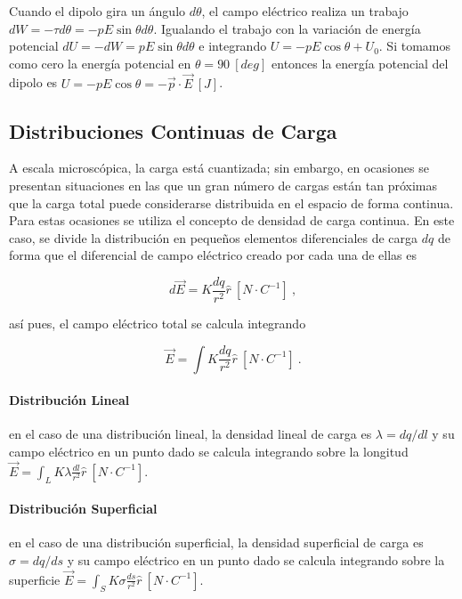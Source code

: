 \documentclass{tufte-handout}
\begin{document}
Cuando el dipolo gira un ángulo $d\theta$, el campo eléctrico realiza un trabajo $dW = -\tau d\theta = -pE\sin{\theta}d\theta$. Igualando el trabajo con la variación de energía potencial $dU = -dW = pE\sin{\theta}d\theta$ e integrando $U = -pE\cos{\theta} + U_0$. Si tomamos como cero la energía potencial en $\theta = 90~[deg]$ entonces la energía potencial del dipolo es $U = -pE\cos{\theta} = -\vec{p}\cdot \vec{E}~[J]$.

\newpage

\subsection{Distribuciones Continuas de Carga}

A escala microscópica, la carga está cuantizada; sin embargo, en ocasiones se presentan situaciones en las que un gran número de cargas están tan próximas que la carga total puede considerarse distribuida en el espacio de forma continua. Para estas ocasiones se utiliza el concepto de densidad de carga continua. En este caso, se divide la distribución en pequeños elementos diferenciales de carga $dq$ de forma que el diferencial de campo eléctrico creado por cada una de ellas es

\begin{equation}
d\vec{E} = K\frac{dq}{r^2}\hat{r}~[N\cdot C^{-1}]~,
\end{equation}

así pues, el campo eléctrico total se calcula integrando

\begin{equation}
\vec{E} = \int K\frac{dq}{r^2}\hat{r}~[N\cdot C^{-1}]~.
\end{equation}

\paragraph{Distribución Lineal} en el caso de una distribución lineal, la densidad lineal de carga es $\lambda = dq / dl$ y su campo eléctrico en un punto dado se calcula integrando sobre la longitud $\vec{E} = \int_L K\lambda\frac{dl}{r^2}\hat{r}~[N\cdot C^{-1}]$.

\paragraph{Distribución Superficial} en el caso de una distribución superficial, la densidad superficial de carga es $\sigma = dq / ds$ y su campo eléctrico en un punto dado se calcula integrando sobre la superficie $\vec{E} = \int_S K\sigma\frac{ds}{r^2}\hat{r}~[N\cdot C^{-1}]$.
\end{document}
